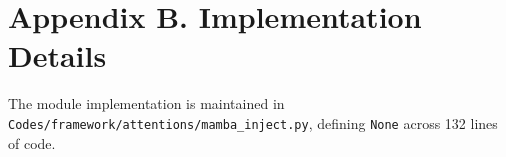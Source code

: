 \section*{Appendix B. Implementation Details}
The module implementation is maintained in \texttt{Codes/framework/attentions/mamba\_inject.py}, defining \texttt{None} across 132 lines of code.
